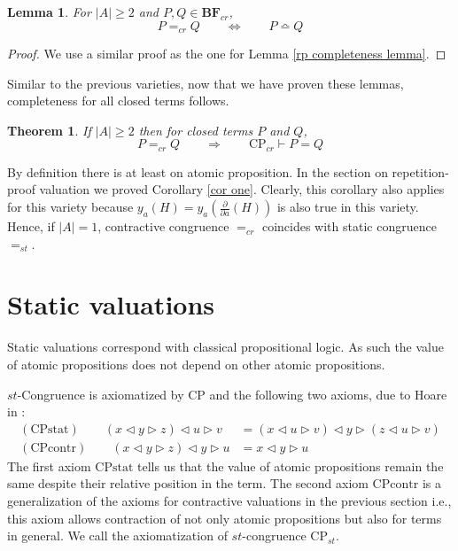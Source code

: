\documentclass[a4paper,twoside,openright]{report}
\newcommand{\dd}[1]{\frac{\partial}{\partial #1}}
\newcommand{\BF}{\ensuremath{\textbf{BF}}}
\newcommand{\syn}{\bumpeq}
\newcommand{\CPcontr}{\ensuremath{\mathrm{CPcontr}}}
\newcommand{\CPstat}{\ensuremath{\mathrm{CPstat}}}
\newcommand{\lef}{\ensuremath{\triangleleft}}
\newcommand{\rig}{\ensuremath{\triangleright}}
\newtheorem{lem}[theorem]{Lemma}
\newtheorem{thm}[theorem]{Theorem}
\begin{document}
\begin{lem}\label{cr completeness lemma}
For $|A|\ge 2$ and $P,Q\in\BF_{cr}$,
\[
P=_{cr}Q\qquad\Longleftrightarrow\qquad P\syn Q
\]
\end{lem}
\begin{proof}
We use a similar proof as the one for Lemma \ref{rp completeness lemma}.
\end{proof} 
Similar to the previous varieties, now that we have proven these lemmas, completeness for all closed terms follows.
\begin{thm}
If $|A|\ge 2$ then for closed terms $P$ and $Q$,
\[
P=_{cr}Q\qquad\Longrightarrow\qquad \text{CP}_{cr}\vdash P=Q
\]
\end{thm}
By definition there is at least on atomic proposition. In the section on repetition-proof valuation we proved Corollary \ref{cor one}. Clearly, this corollary also applies for this variety because $y_a(H)=y_a(\dd a(H))$ is also true in this variety. Hence, if $|A|=1$, contractive congruence $=_{cr}$ coincides with static congruence $=_{st}$.


\section{Static valuations}
Static valuations correspond with classical propositional logic. As such the value of atomic propositions does not depend on other atomic propositions.

$st$-Congruence is axiomatized by CP and the following two axioms, due to Hoare in \cite{hoare}:
\begin{align*}
(\CPstat)\qquad (x\lef y\rig z)\lef u\rig v &=
(x\lef u\rig v)\lef y\rig(z\lef u\rig v)\\
(\CPcontr)\qquad (x\lef y\rig z)\lef y\rig u &= x\lef y\rig u
\end{align*}
The first axiom \CPstat{} tells us that the value of atomic propositions remain the same despite their relative position in the term. The second axiom \CPcontr{} is a generalization of the axioms for contractive valuations in the previous section i.e., this axiom allows contraction of not only atomic propositions but also for terms in general. We call the axiomatization of $st$-congruence $\text{CP}_{st}$.
\end{document}
